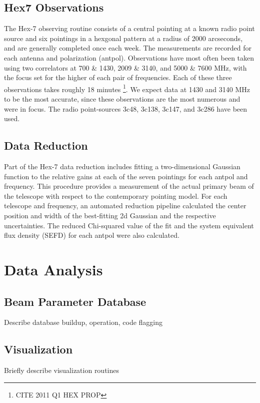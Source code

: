 \documentclass[preprint]{aastex}
\begin{document}
\subsection{Hex7 Observations}\label{ss.observations}
The Hex-7 observing routine consists of a central pointing at a known
radio point source and six pointings in a hexgonal pattern at a radius
of 2000 arcseconds, and are generally completed once each week.  The
measurements are recorded for each antenna and polarization
(antpol). Observations have most often been taken using two
correlators at 700 \& 1430, 2009 \& 3140, and 5000 \& 7600 MHz, with
the focus set for the higher of each pair of frequencies.  Each of
these three observations takes roughly 18 minutes \footnote{CITE 2011
  Q1 HEX PROP}. We expect data at 1430 and 3140 MHz to be the most
accurate, since these observations are the most numerous and were in
focus. The radio point-sources 3c48, 3c138, 3c147, and 3c286 have been
used.

\subsection{Data Reduction}\label{ss.reduction}
Part of the Hex-7 data reduction includes fitting a two-dimensional
Gaussian function to the relative gains at each of the seven pointings
for each antpol and frequency.  This procedure provides a measurement
of the actual primary beam of the telescope with respect to the
contemporary pointing model.  For each telescope and frequency, an
automated reduction pipeline calculated the center position and width
of the best-fitting 2d Gaussian and the respective uncertainties.  The
reduced Chi-squared value of the fit and the system equivalent flux
density (SEFD) for each antpol were also calculated.

\section{Data Analysis}\label{s.analysis}

\subsection{Beam Parameter Database}\label{ss.database}
Describe database buildup, operation, code
flagging

\subsection{Visualization}\label{ss.visualization}
Briefly describe visualization routines
\end{document}
